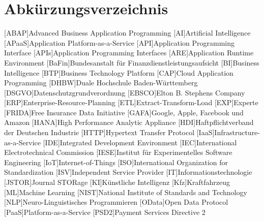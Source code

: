 \clearpage
\chapter*{Abkürzungsverzeichnis}	


\begin{acronym}[XXXXXXX]
	[ABAP]{Advanced Business Application Programming}
	[AI]{Artificial Intelligence}
	[APaaS]{Application Platform-as-a-Service}
	[API]{Application Programming Interface}
	[APIs]{Application Programming Interfaces}	
	[ARE]{Application Runtime Environment}
	[BaFin]{Bundesanstalt für Finanzdienstleistungsaufsicht}
	[BI]{Business Intelligence}
	[BTP]{Business Technology Platform}
	[CAP]{Cloud Application Programming}
	[DHBW]{Duale Hochschule Baden-Württemberg}
	[DSGVO]{Datenschutzgrundverordnung}
	[EBSCO]{Elton B. Stephens Company}
	[ERP]{Enterprise-Resource-Planning}
	[ETL]{Extract-Transform-Load}
	[EXP]{Experte}
	[FRIDA]{Free Insurance Data Initiative}
	[GAFA]{Google, Apple, Facebook und Amazon}
	[HANA]{High Performance Analytic Appliance}
	[HDI]{Haftpflichtverband der Deutschen Industrie}
	[HTTP]{Hypertext Transfer Protocol}
	[IaaS]{Infrastructure-as-a-Service}
	[IDE]{Integrated Development Environment}
	[IEC]{International Electrotechnical Commission}
	[IESE]{Institut für Experimentelles Software Engineering}
	[IoT]{Internet-of-Things}
	[ISO]{International Organization for Standardization}
	[ISV]{Independent Service Provider}
	[IT]{Informationstechnologie}
	[JSTOR]{Journal STORage}
	[KI]{Künstliche Intelligenz}
	[Kfz]{Kraftfahrzeug}
	[ML]{Machine Learning}
	[NIST]{National Institute of Standards and Technology}
	[NLP]{Neuro-Linguistisches Programmieren}
	[OData]{Open Data Protocol}
	[PaaS]{Platform-as-a-Service}
	[PSD2]{Payment Services Directive 2}

\end{acronym}
